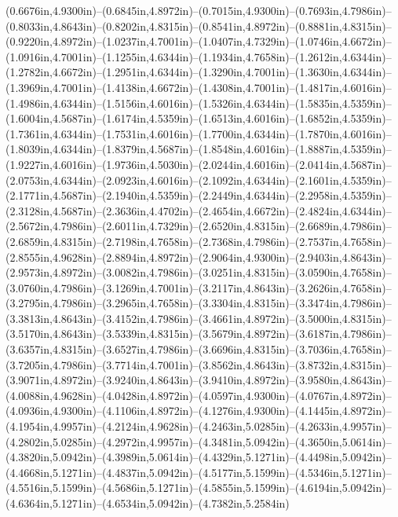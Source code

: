 (0.6676in,4.9300in)--(0.6845in,4.8972in)--(0.7015in,4.9300in)--(0.7693in,4.7986in)--(0.8033in,4.8643in)--(0.8202in,4.8315in)--(0.8541in,4.8972in)--(0.8881in,4.8315in)--(0.9220in,4.8972in)--(1.0237in,4.7001in)--(1.0407in,4.7329in)--(1.0746in,4.6672in)--(1.0916in,4.7001in)--(1.1255in,4.6344in)--(1.1934in,4.7658in)--(1.2612in,4.6344in)--(1.2782in,4.6672in)--(1.2951in,4.6344in)--(1.3290in,4.7001in)--(1.3630in,4.6344in)--(1.3969in,4.7001in)--(1.4138in,4.6672in)--(1.4308in,4.7001in)--(1.4817in,4.6016in)--(1.4986in,4.6344in)--(1.5156in,4.6016in)--(1.5326in,4.6344in)--(1.5835in,4.5359in)--(1.6004in,4.5687in)--(1.6174in,4.5359in)--(1.6513in,4.6016in)--(1.6852in,4.5359in)--(1.7361in,4.6344in)--(1.7531in,4.6016in)--(1.7700in,4.6344in)--(1.7870in,4.6016in)--(1.8039in,4.6344in)--(1.8379in,4.5687in)--(1.8548in,4.6016in)--(1.8887in,4.5359in)--(1.9227in,4.6016in)--(1.9736in,4.5030in)--(2.0244in,4.6016in)--(2.0414in,4.5687in)--(2.0753in,4.6344in)--(2.0923in,4.6016in)--(2.1092in,4.6344in)--(2.1601in,4.5359in)--(2.1771in,4.5687in)--(2.1940in,4.5359in)--(2.2449in,4.6344in)--(2.2958in,4.5359in)--(2.3128in,4.5687in)--(2.3636in,4.4702in)--(2.4654in,4.6672in)--(2.4824in,4.6344in)--(2.5672in,4.7986in)--(2.6011in,4.7329in)--(2.6520in,4.8315in)--(2.6689in,4.7986in)--(2.6859in,4.8315in)--(2.7198in,4.7658in)--(2.7368in,4.7986in)--(2.7537in,4.7658in)--(2.8555in,4.9628in)--(2.8894in,4.8972in)--(2.9064in,4.9300in)--(2.9403in,4.8643in)--(2.9573in,4.8972in)--(3.0082in,4.7986in)--(3.0251in,4.8315in)--(3.0590in,4.7658in)--(3.0760in,4.7986in)--(3.1269in,4.7001in)--(3.2117in,4.8643in)--(3.2626in,4.7658in)--(3.2795in,4.7986in)--(3.2965in,4.7658in)--(3.3304in,4.8315in)--(3.3474in,4.7986in)--(3.3813in,4.8643in)--(3.4152in,4.7986in)--(3.4661in,4.8972in)--(3.5000in,4.8315in)--(3.5170in,4.8643in)--(3.5339in,4.8315in)--(3.5679in,4.8972in)--(3.6187in,4.7986in)--(3.6357in,4.8315in)--(3.6527in,4.7986in)--(3.6696in,4.8315in)--(3.7036in,4.7658in)--(3.7205in,4.7986in)--(3.7714in,4.7001in)--(3.8562in,4.8643in)--(3.8732in,4.8315in)--(3.9071in,4.8972in)--(3.9240in,4.8643in)--(3.9410in,4.8972in)--(3.9580in,4.8643in)--(4.0088in,4.9628in)--(4.0428in,4.8972in)--(4.0597in,4.9300in)--(4.0767in,4.8972in)--(4.0936in,4.9300in)--(4.1106in,4.8972in)--(4.1276in,4.9300in)--(4.1445in,4.8972in)--(4.1954in,4.9957in)--(4.2124in,4.9628in)--(4.2463in,5.0285in)--(4.2633in,4.9957in)--(4.2802in,5.0285in)--(4.2972in,4.9957in)--(4.3481in,5.0942in)--(4.3650in,5.0614in)--(4.3820in,5.0942in)--(4.3989in,5.0614in)--(4.4329in,5.1271in)--(4.4498in,5.0942in)--(4.4668in,5.1271in)--(4.4837in,5.0942in)--(4.5177in,5.1599in)--(4.5346in,5.1271in)--(4.5516in,5.1599in)--(4.5686in,5.1271in)--(4.5855in,5.1599in)--(4.6194in,5.0942in)--(4.6364in,5.1271in)--(4.6534in,5.0942in)--(4.7382in,5.2584in) 